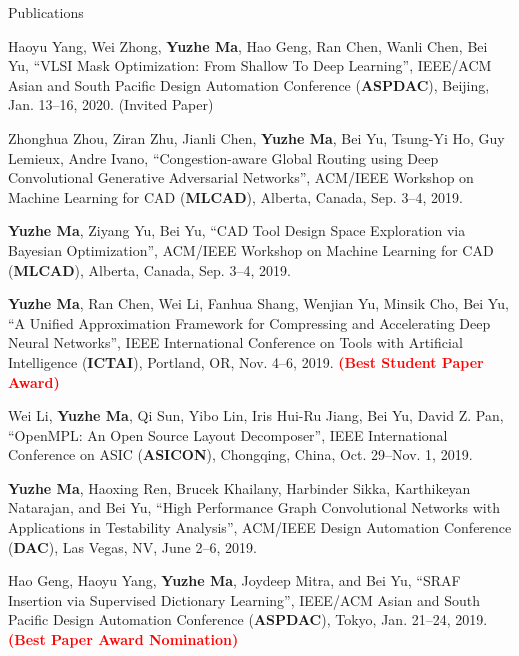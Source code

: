 \begin{rSection}{Publications}
\begin{description}[font=\normalfont]
\item[{[C12]}]{
        Haoyu Yang, Wei Zhong, \textbf{Yuzhe Ma}, Hao Geng, Ran Chen, Wanli Chen, Bei Yu,
        ``VLSI Mask Optimization: From Shallow To Deep Learning'',
        IEEE/ACM Asian and South Pacific Design Automation Conference (\textbf{ASPDAC}), Beijing, Jan. 13--16, 2020. (Invited Paper)
}

\item[{[C11]}]{
        Zhonghua Zhou, Ziran Zhu, Jianli Chen, \textbf{Yuzhe Ma}, Bei Yu, Tsung-Yi Ho, Guy Lemieux, Andre Ivano,
        ``Congestion-aware Global Routing using Deep Convolutional Generative Adversarial Networks'',
        ACM/IEEE Workshop on Machine Learning for CAD (\textbf{MLCAD}), Alberta, Canada, Sep. 3--4, 2019.
}

\item[{[C10]}]{
        \textbf{Yuzhe Ma}, Ziyang Yu, Bei Yu,
        ``CAD Tool Design Space Exploration via Bayesian Optimization'',
        ACM/IEEE Workshop on Machine Learning for CAD (\textbf{MLCAD}), Alberta, Canada, Sep. 3--4, 2019.
}

\item[{[C9]}]{
   \textbf{Yuzhe Ma}, Ran Chen, Wei Li, Fanhua Shang, Wenjian Yu, Minsik Cho, Bei Yu,
        ``A Unified Approximation Framework for Compressing and Accelerating Deep Neural Networks'',
        IEEE International Conference on Tools with Artificial Intelligence (\textbf{ICTAI}), Portland, OR, Nov. 4--6, 2019.
        \textcolor{red}{\textbf{(Best Student Paper Award)}}
}

\item[{[C8]}]{
        Wei Li, \textbf{Yuzhe Ma}, Qi Sun, Yibo Lin, Iris Hui-Ru Jiang, Bei Yu, David Z. Pan,
        ``OpenMPL: An Open Source Layout Decomposer'',
        IEEE International Conference on ASIC (\textbf{ASICON}), Chongqing, China, Oct. 29--Nov. 1, 2019.
}

\item[{[C7]}]{
	\textbf{Yuzhe Ma}, Haoxing Ren, Brucek Khailany, Harbinder Sikka, Karthikeyan Natarajan, and Bei Yu,
     ``High Performance Graph Convolutional Networks with Applications in Testability Analysis'',
     ACM/IEEE Design Automation Conference (\textbf{DAC}), Las Vegas, NV, June 2--6, 2019.
}

\item[{[C6]}]{
	Hao Geng, Haoyu Yang, \textbf{Yuzhe Ma}, Joydeep Mitra, and Bei Yu,
	``SRAF Insertion via Supervised Dictionary Learning'',
	IEEE/ACM Asian and South Pacific Design Automation Conference (\textbf{ASPDAC}), Tokyo, Jan. 21--24, 2019. \textbf{\textcolor{red}{(Best Paper Award Nomination)}}
}


\end{description}
\end{rSection}
